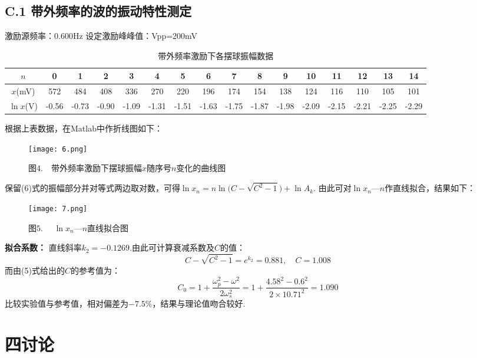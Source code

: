 \documentclass{ctexart}
\begin{document}
\subsection*{C.1 带外频率的波的振动特性测定}
\noindent 激励源频率：0.600Hz \quad  设定激励峰峰值：Vpp=200mV\\
\begin{table}[!htbp]
  \small
  \centering
  \caption{带外频率激励下各摆球振幅数据}\vspace{0.3em} \label{tab:aStrangeTable}
  \begin{tabular}{c|ccccccccccccccc}
  \toprule
  $n$& 0&1& 2& 3& 4& 5& 6& 7& 8& 9& 10& 11& 12& 13& 14\\
  \midrule
  $x$(mV)&     572&    484&   408& 336&     270& 220& 196& 174& 154& 138& 124& 116  & 110&  105& 101\\
  $\ln x$(V)& -0.56& -0.73& -0.90& -1.09 & -1.31& -1.51&-1.63& -1.75& -1.87& -1.98& -2.09& -2.15 & -2.21&  -2.25& -2.29\\
  \bottomrule
  \end{tabular}
  \end{table}

\noindent  根据上表数据，在Matlab中作折线图如下：
  \begin{figure}[!htbp]
    \centering
    \texttt{[image: 6.png]}
    \caption*{图$4.\quad $带外频率激励下摆球振幅$x$随序号$n$变化的曲线图}
  \end{figure}

\noindent 保留(6)式的振幅部分并对等式两边取对数，可得$\ln x_n=n\ln\Big(C-\sqrt{C^2-1}\Big)+\ln A_k$.
由此可对$\ln x_n$—$n$作直线拟合，结果如下：\\
\begin{figure}[!htbp]
  \centering
  \texttt{[image: 7.png]}
  \caption*{图$5.\quad$ $\ln x_n$—$n$直线拟合图}
\end{figure}

\noindent \textbf{拟合系数：} 直线斜率$k_2=-0.1269$.由此可计算衰减系数及$C$的值：
\begin{equation*}
  C-\sqrt{C^2-1}=e^{k_2}=0.881,\quad    C=1.008
\end{equation*}
而由(5)式给出的$C$的参考值为：
\begin{equation*}
  C_0=1+\frac{\omega_p^2-\omega^2}{2\omega_s^2}=1+\frac{4.58^2-0.6^2}{2\times 10.71^2}=1.090
\end{equation*}
比较实验值与参考值，相对偏差为$-7.5\%$，结果与理论值吻合较好.
\clearpage
\section*{四\quad 讨论}
\end{document}
